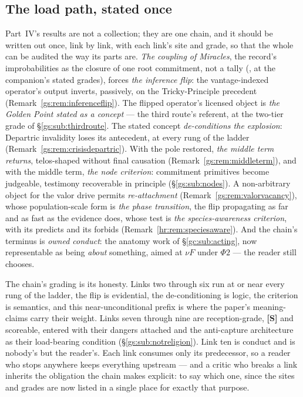 \documentclass[11pt]{article}
\numberwithin{equation}{section}
\theoremstyle{plain}
\theoremstyle{definition}
\theoremstyle{remark}
\begin{document}
\subsection{The load path, stated once}\label{gs:sub:loadpath}

Part~IV's results are not a collection; they are one chain, and it
should be written out once, link by link, with each link's site and
grade, so that the whole can be audited the way its parts are. \emph{The coupling of Miracles}, the record's improbabilities as
the closure of one root commitment, not a tally
(\cite{Nexus}, at the companion's stated grades), forces
\emph{the inference flip}: the vantage-indexed operator's output
inverts, passively, on the Tricky-Principle precedent
(Remark~\ref{gs:rem:inferenceflip}). The flipped operator's licensed
object is \emph{the Golden Point stated as a concept} --- the third
route's referent, at the two-tier grade of
\S\ref{gs:sub:thirdroute}. The stated concept \emph{de-conditions
the explosion}: Departric invalidity loses its antecedent, at every
rung of the ladder (Remark~\ref{gs:rem:crisisdepartric}). With the
pole restored, \emph{the middle term returns}, telos-shaped
without final causation (Remark~\ref{gs:rem:middleterm}), and
with the middle term, \emph{the node criterion}: commitment
primitives become judgeable, testimony recoverable in principle
(\S\ref{gs:sub:nodes}). A non-arbitrary object for the valor drive
permits \emph{re-attachment} (Remark~\ref{gs:rem:valorvacancy}),
whose population-scale form is \emph{the phase transition}, the
flip propagating as far and as fast as the evidence does, whose
test is \emph{the species-awareness criterion}, with its predicts
and its forbids (Remark~\ref{hr:rem:speciesaware}). And the chain's
terminus is \emph{owned conduct}: the anatomy work of
\S\ref{gc:sub:acting}, now representable as being \emph{about}
something, aimed at $\nu F$ under $\Phi2$ --- the reader still
chooses.

The chain's grading is its honesty. Links two through six run at or
near every rung of the ladder, the flip is evidential, the
de-conditioning is logic, the criterion is semantics, and this
near-unconditional prefix is where the paper's meaning-claims carry
their weight. Links seven through nine are reception-grade,
\textbf{[S]} and scoreable, entered with their dangers attached and
the anti-capture architecture as their load-bearing condition
(\S\ref{gs:sub:notreligion}). Link ten is conduct and is nobody's
but the reader's. Each link consumes only its predecessor, so a
reader who stops anywhere keeps everything upstream --- and a critic
who breaks a link inherits the obligation the chain makes explicit:
to say which one, since the sites and grades are now listed in a
single place for exactly that purpose.
\end{document}
